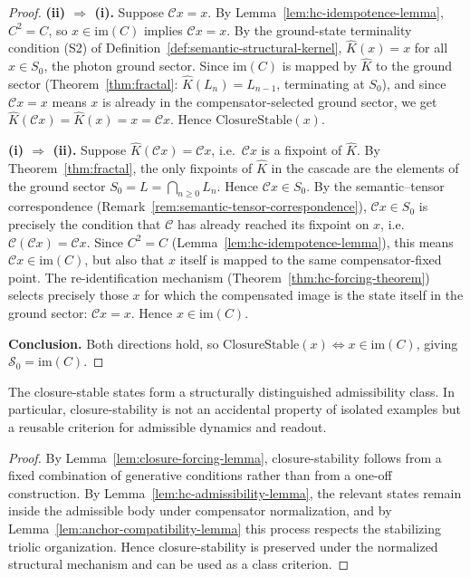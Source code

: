 \begin{proof}
\textbf{(ii) $\Rightarrow$ (i).}
Suppose $\mathcal{C}x = x$. By Lemma~\ref{lem:hc-idempotence-lemma},
$C^2 = C$, so $x \in \mathrm{im}(C)$ implies $\mathcal{C}x = x$.
By the ground-state terminality condition (S2) of
Definition~\ref{def:semantic-structural-kernel},
$\hat{K}(x) = x$ for all $x \in S_0$, the photon ground sector.
Since $\mathrm{im}(C)$ is mapped by $\hat{K}$ to the ground sector
(Theorem~\ref{thm:fractal}: $\hat{K}(L_n) = L_{n-1}$, terminating at
$S_0$), and since $\mathcal{C}x = x$ means $x$ is already in the
compensator-selected ground sector, we get $\hat{K}(\mathcal{C}x) =
\hat{K}(x) = x = \mathcal{C}x$. Hence $\mathrm{ClosureStable}(x)$.

\smallskip
\textbf{(i) $\Rightarrow$ (ii).}
Suppose $\hat{K}(\mathcal{C}x) = \mathcal{C}x$, i.e.\ $\mathcal{C}x$ is a fixpoint of $\hat{K}$.
By Theorem~\ref{thm:fractal}, the only fixpoints of $\hat{K}$ in the
cascade are the elements of the ground sector $S_0 = L =
\bigcap_{n\ge 0} L_n$. Hence $\mathcal{C}x \in S_0$.
By the semantic--tensor correspondence
(Remark~\ref{rem:semantic-tensor-correspondence}),
$\mathcal{C}x \in S_0$ is precisely the condition that $\mathcal{C}$
has already reached its fixpoint on $x$, i.e.\ $\mathcal{C}(\mathcal{C}x)
= \mathcal{C}x$. Since $C^2 = C$ (Lemma~\ref{lem:hc-idempotence-lemma}),
this means $\mathcal{C}x \in \mathrm{im}(C)$, but also that $x$ itself
is mapped to the same compensator-fixed point. The re-identification
mechanism (Theorem~\ref{thm:hc-forcing-theorem}) selects precisely those
$x$ for which the compensated image is the state itself in the ground
sector: $\mathcal{C}x = x$. Hence $x \in \mathrm{im}(C)$.

\smallskip
\textbf{Conclusion.}
Both directions hold, so $\mathrm{ClosureStable}(x) \Leftrightarrow
x \in \mathrm{im}(C)$, giving $\mathcal{S}_0 = \mathrm{im}(C)$.
\end{proof}

\begin{proposition}
\label{prop:closure-class-proposition}
The closure-stable states form a structurally distinguished admissibility class.
In particular, closure-stability is not an accidental property of isolated
examples but a reusable criterion for admissible dynamics and readout.
\end{proposition}

\begin{proof}
By Lemma~\ref{lem:closure-forcing-lemma}, closure-stability follows from a fixed
combination of generative conditions rather than from a one-off construction.
By Lemma~\ref{lem:hc-admissibility-lemma}, the relevant states remain inside the
admissible body under compensator normalization, and by
Lemma~\ref{lem:anchor-compatibility-lemma} this process respects the stabilizing
triolic organization. Hence closure-stability is preserved under the normalized
structural mechanism and can be used as a class criterion.
\end{proof}

